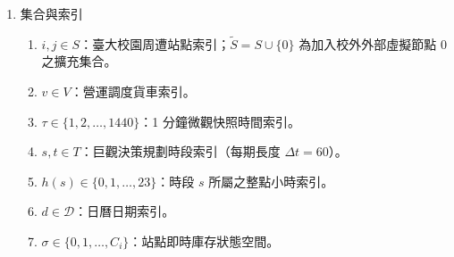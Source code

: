 \begin{enumerate}
\item 集合與索引
\begin{enumerate}[label = \textbullet]
    \item $i, j \in S$：臺大校園周遭站點索引；$\tilde{S} = S \cup \{0\}$ 為加入校外外部虛擬節點 $0$ 之擴充集合。
    \item $v \in V$：營運調度貨車索引。
    \item $\tau \in \{1, 2, \dots, 1440\}$：1 分鐘微觀快照時間索引。
    \item $s, t \in T$：巨觀決策規劃時段索引（每期長度 $\Delta t=60$）。
    \item $h(s) \in \{0, 1, \dots, 23\}$：時段 $s$ 所屬之整點小時索引。
    \item $d \in \mathcal{D}$：日曆日期索引。
    \item $\sigma \in \{0, 1, \dots, C_i\}$：站點即時庫存狀態空間。
\end{enumerate}


\end{enumerate}
